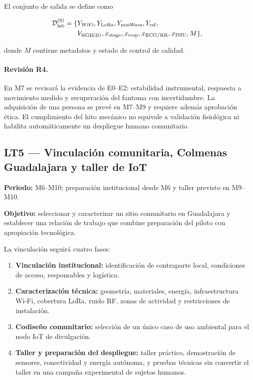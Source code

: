 El conjunto de salida se define como

\begin{equation}
\begin{aligned}
\mathcal D_{\rm lab}^{(0)}=\{&Y_{\rm WiFi},Y_{\rm LoRa},Y_{\rm mmWave},Y_{\rm ref},\\
&V_{\rm RGB(D)},x_{\rm stage},x_{\rm resp},x_{\rm ECG/RR},x_{\rm IMU},M\},
\end{aligned}
\end{equation}

donde $M$ contiene metadatos y estado de control de calidad.

\paragraph{Revisión R4.}
En M7 se revisará la evidencia de E0--E2: estabilidad instrumental, respuesta a
movimiento medido y recuperación del fantoma con incertidumbre. La adquisición de
una persona se prevé en M7--M9 y requiere además aprobación ética. El cumplimiento
del hito mecánico no equivale a validación fisiológica ni habilita automáticamente
un despliegue humano comunitario.

\subsection{LT5 --- Vinculación comunitaria, Colmenas Guadalajara y taller de IoT}
\label{sec:wp5_stage1}

\textbf{Periodo:} M6--M10; preparación institucional desde M6 y taller previsto en M9--M10.

\textbf{Objetivo:} seleccionar y caracterizar un sitio comunitario en Guadalajara y
establecer una relación de trabajo que combine preparación del piloto con apropiación
tecnológica.

La vinculación seguirá cuatro fases:
\begin{enumerate}[label=\textbf{V\arabic*:},leftmargin=3em]
    \item \textbf{Vinculación institucional:} identificación de contraparte local,
    condiciones de acceso, responsables y logística.
    \item \textbf{Caracterización técnica:} geometría, materiales, energía,
    infraestructura Wi-Fi, cobertura LoRa, ruido RF, zonas de actividad y restricciones
    de instalación.
    \item \textbf{Codiseño comunitario:} selección de un único caso de uso ambiental
    para el nodo IoT de divulgación.
    \item \textbf{Taller y preparación del despliegue:} taller práctico, demostración de sensores,
    conectividad y energía autónoma, y pruebas técnicas sin convertir el taller en una
    campaña experimental de sujetos humanos.
\end{enumerate}

